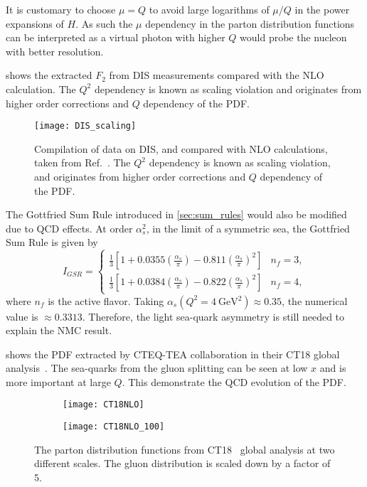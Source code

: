 \documentclass[../main.tex]{subfiles}
\begin{document}
It is customary to choose $\mu =Q$ to avoid large logarithms of $\mu /Q$ in the
power expansions of $H$. As such the $\mu$ dependency in the parton distribution
functions can be interpreted as a virtual photon with higher $Q$ would probe the
nucleon with better resolution.

 shows the extracted $F_2$ from DIS measurements compared
with the NLO calculation. The $Q^2$ dependency is known as scaling violation and
originates from higher order corrections and $Q$ dependency of the PDF.
\begin{figure}[h!]
	\centering
	\texttt{[image: DIS\_scaling]}
	\caption{
		Compilation of data on DIS, and compared with NLO calculations,
		taken from Ref.~\cite{adloff2003}.
		The $Q^2$ dependency is known as scaling violation,
		and originates from higher order corrections and $Q$ dependency of the PDF.
	}
	\label{fig:DIS_scaling}
\end{figure}
The Gottfried Sum Rule introduced in \cref{sec:sum_rules} would also be modified due to
QCD effects. At order $\alpha_s^2$, in the limit of a symmetric sea, the Gottfried Sum Rule
is given by~\cite{kataev2003}
\begin{equation}
	I_{GSR} = \begin{cases}
		\frac{1}{3}\left[ 1 + 0.0355\left(\frac{\alpha_s}{\pi}\right)-0.811\left(\frac{\alpha_s}{\pi}\right)^2 \right] & n_f=3, \\
		\frac{1}{3}\left[ 1 + 0.0384\left(\frac{\alpha_s}{\pi}\right)-0.822\left(\frac{\alpha_s}{\pi}\right)^2 \right] & n_f=4,
	\end{cases}
\end{equation}
where $n_f$ is the active flavor.
Taking $\alpha_s(Q^2=\SI{4}{\GeV^2})\approx 0.35$, the numerical value is $\approx 0.3313$. Therefore,
the light sea-quark asymmetry is still needed to explain the NMC result.

 shows the PDF extracted by CTEQ-TEA collaboration in their
CT18 global analysis~\cite{hou2021}. The sea-quarks from the gluon splitting
can be seen at low $x$ and is more important at large $Q$. This demonstrate the
QCD evolution of the PDF.

\begin{figure}
	\centering
	\begin{subfigure}{0.48\linewidth}
		\texttt{[image: CT18NLO]}
	\end{subfigure}
	\begin{subfigure}{0.48\linewidth}
		\texttt{[image: CT18NLO\_100]}
	\end{subfigure}
	\caption{The parton distribution functions from CT18~\cite{hou2021} global analysis at two different scales.
		The gluon distribution is scaled down by a factor of 5.}
	\label{fig:CT18_scale}
\end{figure}
\end{document}
